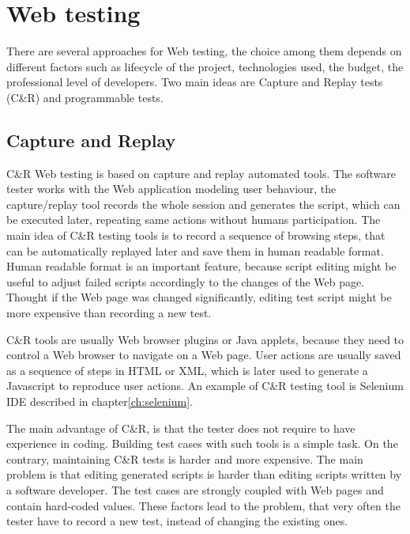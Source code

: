 	\chapter{Web testing}
	\label{ch:Webtesting}

		There are several approaches for Web testing, the choice among them depends on
		different factors such as lifecycle of the project, technologies used, the
		budget, the professional level of developers. Two main ideas are Capture and
		Replay tests (C\&R) and programmable tests.
		
		\section{Capture and Replay}
		\label{sec:captureReplay}
			C\&R Web testing is based on capture and replay automated
			tools\cite{CaptureReplay7}.  The software tester works with the Web
			application modeling user behaviour, the capture/replay tool records the
			whole session and generates the script, which can be executed later,
			repeating same actions without humans participation. The main idea of C\&R
			testing tools is to record a sequence of browsing steps, that can be
			automatically replayed later and save them in human readable format. Human
			readable format is an important feature, because script editing might
			 be useful to adjust failed scripts accordingly	to the changes of the Web page.
			 Thought if the Web page was changed
			significantly, editing test script might be more expensive than recording a
			new test\cite{AnupamCaptureReplay}. 
			
C\&R tools are usually Web browser plugins or Java applets, because they
need to control a Web browser to navigate on a Web page. User actions are
usually saved as a sequence of steps in HTML or XML, which is later used to
generate a Javascript to reproduce user actions. An example of C\&R testing
tool is Selenium IDE described in chapter\ref{ch:selenium}.

The main advantage of C\&R, is that the tester does not
require to have experience in coding. Building test cases with such tools
is a simple task.
On the contrary, maintaining C\&R tests is harder and more expensive.
The main problem is that editing generated scripts is harder than editing
scripts written by a software developer. The test cases are strongly coupled
with Web pages and contain hard-coded values. These factors lead to the
problem, that very often the tester have to record a new test, instead of
changing the existing ones.

